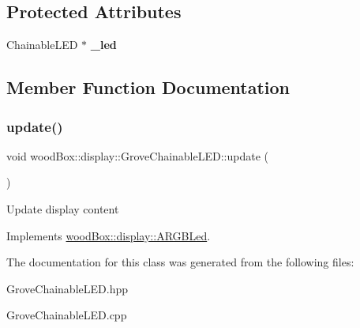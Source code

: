 \subsection*{Protected Attributes}
\begin{DoxyCompactItemize}
\item 
\mbox{\label{classwood_box_1_1display_1_1_grove_chainable_l_e_d_a09907b1216ee2727c33e1c0a6e960b03}} 
Chainable\+L\+ED $\ast$ {\bfseries \+\_\+led}
\end{DoxyCompactItemize}


\subsection{Member Function Documentation}
\mbox{\label{classwood_box_1_1display_1_1_grove_chainable_l_e_d_a650969665d0b5607465a63159c62e4ef}} 
\subsubsection{\texorpdfstring{update()}{update()}}
{\footnotesize\ttfamily void wood\+Box\+::display\+::\+Grove\+Chainable\+L\+E\+D\+::update (\begin{DoxyParamCaption}{ }\end{DoxyParamCaption})\hspace{0.3cm}{\ttfamily [virtual]}}

Update display content 

Implements \mbox{\hyperlink{classwood_box_1_1display_1_1_a_r_g_b_led_ab71f321d91e931f95b96d1f492a9454d}{wood\+Box\+::display\+::\+A\+R\+G\+B\+Led}}.



The documentation for this class was generated from the following files\+:\begin{DoxyCompactItemize}
\item 
Grove\+Chainable\+L\+E\+D.\+hpp\item 
Grove\+Chainable\+L\+E\+D.\+cpp\end{DoxyCompactItemize}
